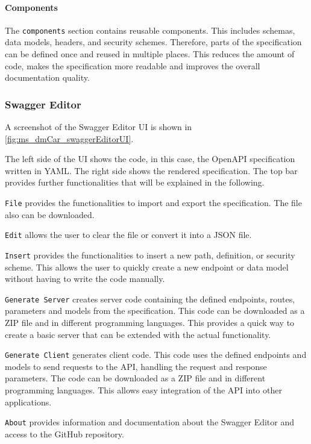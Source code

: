 \paragraph*{Components}
The \texttt{components} section contains reusable components.
This includes schemas, data models, headers, and security schemes.
Therefore, parts of the specification can be defined once and reused in multiple places.
This reduces the amount of code, makes the specification more readable and improves the overall documentation quality.

\subsubsection*{Swagger Editor}
A screenshot of the Swagger Editor UI is shown in \autoref{fig:ms_dmCar_swaggerEditorUI}.

The left side of the UI shows the code, in this case, the OpenAPI specification written in YAML.
The right side shows the rendered specification.
The top bar provides further functionalities that will be explained in the following.

\texttt{File} provides the functionalities to import and export the specification.
The file also can be downloaded.

\texttt{Edit} allows the user to clear the file or convert it into a JSON file.

\texttt{Insert} provides the functionalities to insert a new path, definition, or security scheme.
This allows the user to quickly create a new endpoint or data model without having to write the code manually.

\texttt{Generate Server} creates server code containing the defined endpoints, routes, parameters and models from the specification.
This code can be downloaded as a ZIP file and in different programming languages.
This provides a quick way to create a basic server that can be extended with the actual functionality.

\texttt{Generate Client} generates client code.
This code uses the defined endpoints and models to send requests to the API, handling the request and response parameters.
The code can be downloaded as a ZIP file and in different programming languages.
This allows easy integration of the API into other applications.

\texttt{About} provides information and documentation about the Swagger Editor and access to the GitHub repository.

